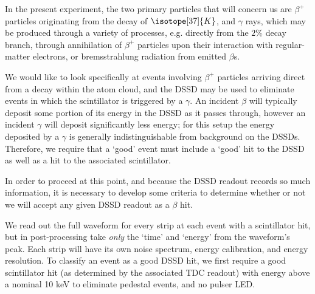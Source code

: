 In the present experiment, the two primary particles that will concern us are $\beta^+$ particles originating from the decay of $\isotope[37]{K}$, and $\gamma$ rays, which may be produced through a variety of processes, e.g. directly from the $2\%$ decay branch, through annihilation of $\beta^+$ particles upon their interaction with regular-matter electrons, or bremsstrahlung radiation from emitted $\beta$s.  

We would like to look specifically at events involving $\beta^+$ particles arriving direct from a decay within the atom cloud, and the DSSD may be used to eliminate events in which the scintillator is triggered by a $\gamma$.  An incident $\beta$ will typically deposit some portion of its energy in the DSSD as it passes through, however an incident $\gamma$ will deposit significantly less energy; for this setup the energy deposited by a $\gamma$ is generally indistinguishable from background on the DSSDs.  Therefore, we require that a `good' event must include a `good' hit to the DSSD as well as a hit to the associated scintillator.   

In order to proceed at this point, and because the DSSD readout records so much information, it is necessary to develop some criteria to determine whether or not we will accept any given DSSD readout as a $\beta$ hit.



We read out the full waveform for every strip at each event with a scintillator hit, but in post-processing take \emph{only} the `time' and `energy' from the waveform's peak.
Each strip will have its own noise spectrum, energy calibration, and energy resolution.  To classify an event as a good DSSD hit, we first require a good scintillator hit (as determined by the associated TDC readout) with energy above a nominal 10 keV to eliminate pedestal events, and no pulser LED.

